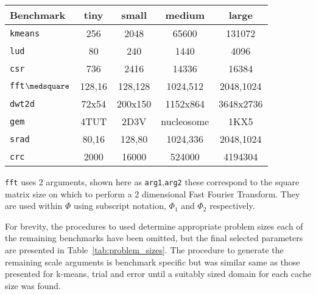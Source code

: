 \documentclass[../document.tex]{subfiles}
\begin{document}


\begin{table*}[t]
\centering
\begin{threeparttable}
    \centering
    \caption{OpenDwarf workload scale parameters $\Phi$}
    \begin{tabular}{l|c|c|c|c}
        \bf Benchmark         & \bf tiny   & small  & medium     & large\\\hline
        {\tt kmeans}          & 256        & 2048   & 65600      & 131072\\
        {\tt lud}             & 80         & 240    & 1440       & 4096\\
        {\tt csr}             & 736        & 2416   & 14336      & 16384\\
        {\tt fft}$\medsquare$ & 128,16     & 128,128& 1024,512   & 2048,1024\\
        {\tt dwt2d}           & 72x54      & 200x150& 1152x864   & 3648x2736\\       
        {\tt gem}             & 4TUT       & 2D3V   & nucleosome & 1KX5\\
        {\tt srad}            & 80,16      & 128,80 & 1024,336   & 2048,1024\\
        {\tt crc}             & 2000       & 16000  & 524000     & 4194304\\
    \end{tabular}
    \begin{tablenotes}
    \item [$\medsquare$] {\tt fft} uses 2 arguments, shown here as {\tt arg1},{\tt arg2} these correspond to the square matrix size on which to perform a 2 dimensional Fast Fourier Transform. They are used within $\Phi$ using subscript notation, $\Phi_1$ and $\Phi_2$ respectively.
    \end{tablenotes}
    \label{tab:problem_sizes}
\end{threeparttable}
\end{table*}

For brevity, the procedures to used determine appropriate problem sizes each of the remaining benchmarks have been omitted, but the final selected parameters are presented in Table~\ref{tab:problem_sizes}.
The procedure to generate the remaining scale arguments is benchmark specific but was similar same as those presented for k-means, trial and error until a suitably sized domain for each cache size was found.
\end{document}
